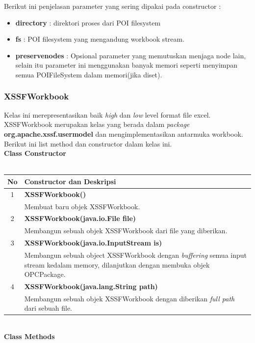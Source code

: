 Berikut ini penjelasan parameter yang sering dipakai pada constructor :
\begin{itemize}
	\item \textbf{directory} : direktori proses dari POI filesystem
	\item \textbf{fs} : POI filesystem yang mengandung workbook stream.
	\item \textbf{preservenodes} : Opsional parameter yang memutuskan menjaga node lain, selain itu parameter ini menggunakan banyak memori seperti menyimpan semua POIFileSystem dalam memori(jika diset).
\end{itemize} 

\subsubsection{XSSFWorkbook}
Kelas ini merepresentasikan baik \textit{high} dan \textit{low} level format file excel. XSSFWorkbook merupakan kelas yang berada dalam \textit{package} \textbf{org.apache.xssf.usermodel} dan mengimplementasikan antarmuka workbook. Berikut ini list method dan constructor dalam kelas ini.\cite{tutpoint}
\\
\noindent \textbf{Class Constructor}\\ \\
	\begin{tabular}{|c|p{12cm}|}
		\hline
		\textbf{No} & \textbf{Constructor dan Deskripsi} \\ \hline \hline
		1 & \textbf{XSSFWorkbook()}\\
			&	Membuat baru objek XSSFWorkbook.\\ \hline 
		2 & \textbf{XSSFWorkbook(java.io.File file)}\\
			&	Membangun sebuah objek XSSFWorkbook dari file yang diberikan.\\ \hline
		3 & \textbf{XSSFWorkbook(java.io.InputStream is)}\\
			&	Membangun sebuah object XSSFWorkbook dengan \textit{buffering} semua input stream kedalam memory, dilanjutkan dengan membuka objek OPCPackage.\\ \hline 
		4 & \textbf{XSSFWorkbook(java.lang.String path)}\\
			&	Membangun sebuah objek XSSFWorkbook dengan diberikan \textit{full path} dari sebuah file.\\ \hline
	\end{tabular}
\\
\noindent \textbf{Class Methods}\\ \\

